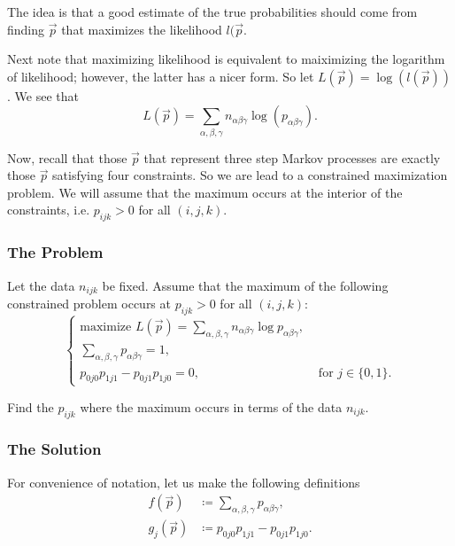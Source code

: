 The idea is that a good estimate of the true probabilities should come from finding \(\vec p\) that
maximizes the likelihood \(l(\vec p\). 

Next note that maximizing likelihood is equivalent to maiximizing the logarithm of likelihood; however,
the latter has a nicer form. So let \(L(\vec p) = \log(l(\vec p))\). We see that
\begin{equation}
L(\vec p) = \sum_{\alpha, \beta, \gamma} n_{\alpha\beta\gamma} \log(p_{\alpha\beta\gamma}).
\end{equation}

Now, recall that those \(\vec p\) that represent three step Markov processes are exactly those \(\vec p\) 
satisfying four constraints. So we are lead to a constrained maximization problem. We will assume that
the maximum occurs at the interior of the constraints, i.e. \(p_{ijk} > 0\) for all \((i, j, k)\). 

\subsubsection*{The Problem}

Let the data \(n_{ijk}\) be fixed. Assume that the maximum of the following constrained problem occurs at \(p_{ijk} > 0\) for all \((i, j, k)\):
\begin{equation}
\begin{cases}
\text{maximize } L(\vec p) = \sum_{\alpha, \beta, \gamma} n_{\alpha\beta\gamma} \log p_{\alpha\beta\gamma}, \\
\sum_{\alpha, \beta, \gamma} p_{\alpha\beta\gamma} = 1, \\
p_{0j0} p_{1j1} - p_{0j1} p_{1j0} = 0, & \text{ for } j \in \{0, 1\}.
\end{cases}
\end{equation}

Find the \(p_{ijk}\) where the maximum occurs in terms of the data \(n_{ijk}\).

\subsubsection*{The Solution}

For convenience of notation, let us make the following definitions
\begin{align}
f(\vec p) & \coloneqq \sum_{\alpha, \beta, \gamma} p_{\alpha\beta\gamma}, \\
g_j(\vec p) & \coloneqq p_{0j0} p_{1j1} - p_{0j1} p_{1j0}.
\end{align}

